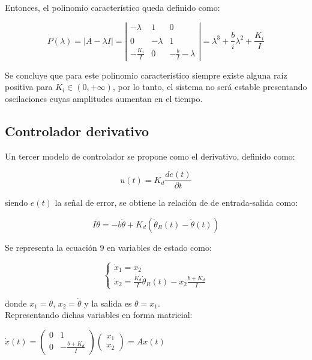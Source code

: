 \documentclass{sig-alternate}
\begin{document}
Entonces, el polinomio caracter\'istico queda definido como:

\begin{equation}
 P( \lambda ) = |A - \lambda I| = 
\left| \begin{array}{ccc}
-\lambda & 1 & 0\\
\\ 0 & -\lambda & 1 \\
-\frac{K_i}{I} & 0 & -\frac{b}{I}-\lambda
\end{array} \right| 
=
\lambda^3 + \frac{b}{i}\lambda^2 + \frac{K_i}{I}
\end{equation}

Se concluye que para este polinomio caracter\'istico 
siempre existe alguna ra\'iz positiva para $K_i \in (0,+\infty)$, por lo tanto, 
el sistema no ser\'a estable presentando oscilaciones cuyas amplitudes aumentan en el tiempo.

\subsection{Controlador derivativo}\label{derivativo}
Un tercer modelo de controlador se propone como el derivativo, definido como:

\begin{equation}
\label{error_modelo3}
u(t) = K_d \frac{d e(t)}{\partial t}
\end{equation}

siendo $e(t)$ la se\~nal de error, se obtiene la relaci\'{o}n de de entrada-salida como:

\begin{equation}
\label{ecuacion_modelo2}
I \ddot\theta = - b \dot\theta + K_d (\dot\theta_R(t) - \dot\theta(t))
\end{equation}

Se representa la ecuaci\'on $9$ en variables de estado como:

\begin{equation}
\label{var_estados_model3}
\begin{cases} 
    \dot x_1 = x_2 \\
    \dot x_2 = \frac{K_d}{I} \dot\theta_R(t) - x_2 \frac{b+ K_d}{I}
\end{cases}
\end{equation}

donde $x_1 = \theta$, $x_2 = \dot \theta$ y la salida es $\theta=x_1$.\\
Representando dichas variables en forma matricial:

\begin{center}
$
\dot x(t) = 
\left( \begin{array}{ccc}
0 & 1 \\
0 & -\frac{b+K_d}{I}
\end{array} \right)
\left( \begin{array}{c}
x_1 \\
x_2
\end{array} \right)
= Ax(t)
$
\end{center}
\end{document}
